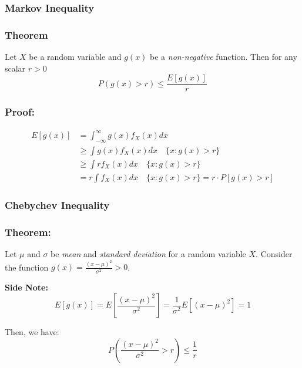 \documentclass{article}
\begin{document}
    \subsubsection{Markov Inequality}
    \subsubsection*{Theorem}
    Let $X$ be a random variable and $g(x)$ be a \textit{non-negative} function. Then for any scalar $r>0$
    \begin{equation*}
        P(g(x) > r) \leq \frac{E[g(x)]}{r}
    \end{equation*}
    
    \subsubsection*{Proof:}
    
    \begin{equation*}
        \begin{split}
            E[g(x)] &= \int_{-\infty}^\infty g(x) f_X(x) dx\\
                    &\geq \int g(x) f_X(x) dx \quad \{ x: g(x) > r \}\\
                    &\geq \int r f_X(x) dx \quad \{ x: g(x) > r \}\\
                    &= r \int f_X(x) dx \quad \{ x: g(x) > r \} = r\cdot P[g(x)>r]
        \end{split}
    \end{equation*}
    
    \subsubsection{Chebychev Inequality}
    \subsubsection*{Theorem:}
    
    Let $\mu$ and $\sigma$ be \textit{mean} and \textit{standard deviation} for a random variable $X$. Consider the function $g(x) = \frac{(x-\mu)^2}{\sigma^2} > 0$. 
    
    \noindent \textbf{Side Note:}
    \begin{equation*}
        E[g(x)] = E\left[ \frac{(x-\mu)^2}{\sigma^2} \right] = \frac{1}{\sigma^2} E[(x-\mu)^2] = 1
    \end{equation*}
    
    Then, we have:
    \begin{equation*}
        P\left( \frac{(x-\mu)^2}{\sigma^2} > r \right) \leq \frac{1}{r}
    \end{equation*}
    
\end{document}
